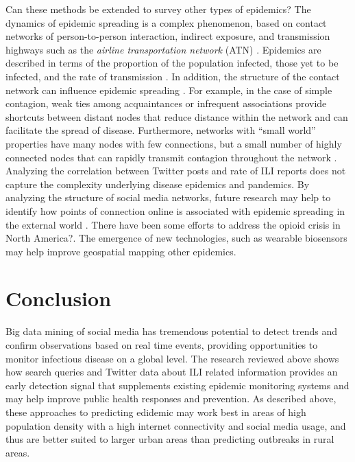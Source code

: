 \documentclass[sigconf]{acmart}
\begin{document}
Can these methods be extended to survey other types of epidemics? The dynamics of epidemic 
spreading is a complex phenomenon, based on contact networks of person-to-person interaction, 
indirect exposure, and transmission highways such as the {\it airline transportation network} 
(ATN) \cite{Colizza06}. Epidemics are described in terms of the proportion of the population 
infected, those yet to be infected, and the rate of transmission \cite{hethcote00}. In 
addition, the structure of the contact network can influence epidemic spreading 
\cite{pastor01}. For example, in the case of simple contagion, weak ties among acquaintances 
or infrequent associations provide shortcuts between distant nodes that reduce distance within 
the network \cite{granovetter73} and can facilitate the spread of disease. Furthermore, 
networks with ``small world'' properties have many nodes with few connections, but a small 
number of highly connected nodes that can rapidly transmit contagion throughout the network 
\cite{watts98}. Analyzing the correlation between Twitter posts and rate of ILI reports does 
not capture the complexity underlying disease epidemics and pandemics. By analyzing the 
structure of social media networks, future research may help to identify how points of 
connection online is associated with epidemic spreading in the external world \cite{zhu17}. 
There have been some efforts to address the opioid crisis in North America?\cite{smith16}. 
The emergence of new technologies, such as wearable biosensors \cite{carreiro15} may help 
improve geospatial mapping other epidemics.

\section{Conclusion}

Big data mining of social media has tremendous potential to detect trends and confirm 
observations based on real time events, providing opportunities to monitor infectious 
disease on a global level. The research reviewed above shows how search queries and 
Twitter data about ILI related information provides an early detection signal that 
supplements existing epidemic monitoring systems and may help improve public health 
responses and prevention. As described above, these approaches to predicting edidemic
may work best in areas of high population density with a high internet connectivity
and social media usage, and thus are better suited to larger urban areas than 
predicting outbreaks in rural areas. 


 
\end{document}
